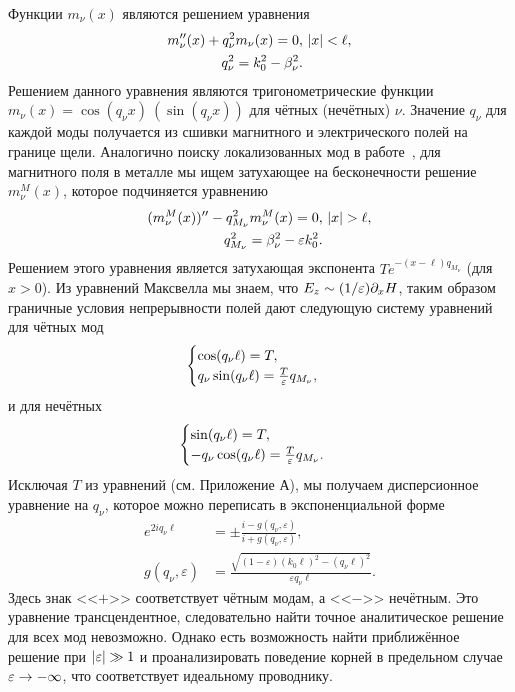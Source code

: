 Функции $m_\nu(x)$ являются 
решением уравнения 
\begin{align}
  m''_\nu(x) + q_{\nu}^{2}m_\nu(x) = 0, & \ \lvert x\rvert<\ell, \\
  q_\nu^2 = k_{0}^{2}-\beta_\nu^{2}.& \nonumber
\end{align}
Решением данного уравнения являются тригонометрические функции $m_\nu(x) = \cos(q_\nu x) \ (\sin(q_\nu x))$ для чётных (нечётных) $\nu$. Значение $q_\nu$ для каждой моды получается из сшивки
магнитного и электрического полей на границе щели.
Аналогично поиску локализованных мод в работе~\cite{sturman2007eigenmodes}, для магнитного поля в металле мы ищем затухающее на бесконечности решение $m_\nu^M(x)$, которое подчиняется уравнению
\begin{align}
  (m^M_\nu(x))'' - q_{M_\nu}^{2}m^M_\nu(x) = 0, & \ \lvert x\rvert>\ell, \\
  q_{M_\nu}^{2} = \beta_\nu^{2}-\varepsilon k_{0}^{2}. &\nonumber
\end{align}
Решением этого уравнения является затухающая экспонента $T e^{-(x-\ell)q_{M_\nu} }$ (для $x>0$). 
Из уравнений Максвелла мы знаем, что $E_z \sim (1/\varepsilon) \partial_x H$, таким образом граничные условия непрерывности полей дают следующую систему уравнений для чётных мод 
\begin{equation}
    \begin{cases}
        \cos(q_\nu \ell) = T, \\
        q_\nu \sin (q_\nu \ell)  = \frac{T}{\varepsilon} q_{M_\nu},
    \end{cases}
\end{equation}
и для нечётных
\begin{equation}
    \begin{cases}
        \sin(q_\nu \ell) = T, \\
        -q_\nu \cos (q_\nu \ell)  = \frac{T}{\varepsilon} q_{M_\nu}. 
    \end{cases}
\end{equation}
Исключая $T$ из уравнений (см. Приложение А), мы получаем дисперсионное уравнение на $q_\nu$, которое можно переписать в экспоненциальной форме
\begin{align}
e^{2i q_\nu \ell} &= \pm \frac{i-g(q_\nu,\varepsilon)}{i+g(q_\nu,\varepsilon)},\label{eq:BoundCond} \\
g(q_\nu,\varepsilon) & = \frac{\sqrt{(1-\varepsilon)(k_0 \ell)^2 - (q_\nu \ell)^2}}{\varepsilon q_\nu \ell}.  \nonumber
\end{align}
Здесь знак <<$+$>> соответствует чётным модам, а <<$-$>> нечётным. Это уравнение трансцендентное, следовательно найти точное аналитическое решение
для всех мод невозможно. Однако есть возможность найти приближённое решение при  $\lvert\varepsilon\rvert \gg 1$ и проанализировать поведение корней в предельном случае $\varepsilon \to -\infty$, что соответствует идеальному проводнику.

